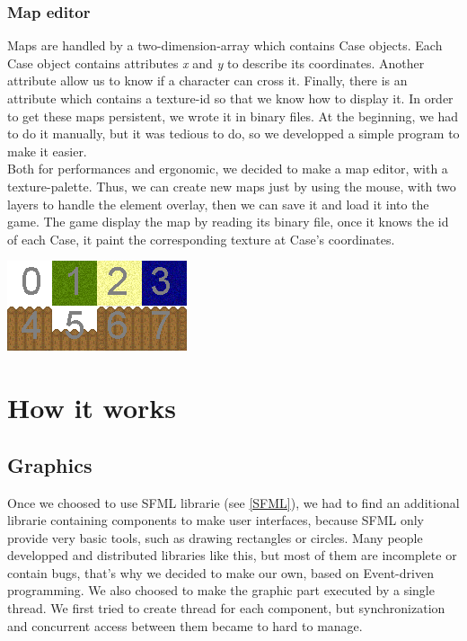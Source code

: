 \documentclass{scrreprt}
\begin{document}
					  \subsection{Map editor}
					  Maps are handled by a two-dimension-array which contains Case objects. Each Case object contains attributes \emph{x} and \emph{y} to describe its coordinates. Another attribute allow us to know if a character can cross it. Finally, there is an attribute which contains a texture-id so that we know how to display it. In order to get these maps persistent, we wrote it in binary files. At the beginning, we had to do it manually, but it was tedious to do, so we developped a simple program to make it easier.\\

					  Both for performances and ergonomic, we decided to make a map editor, with a texture-palette. Thus, we can create new maps just by using the mouse, with two layers to handle the element overlay, then we can save it and load it into the game. The game display the map by reading its binary file, once it knows the id of each Case, it paint the corresponding texture at Case's coordinates.

					  \begin{center}
					  \includegraphics{image1.png}
					  \end{center}


					  \chapter{How it works}
					  \section{Graphics}
					  Once we choosed to use SFML librarie (see \ref{SFML}), we had to find an additional librarie containing components to make user interfaces, because SFML only provide very basic tools, such as drawing rectangles or circles. Many people developped and distributed libraries like this, but most of them are incomplete or contain bugs, that's why we decided to make our own, based on Event-driven programming. We also choosed to make the graphic part executed by a single thread. We first tried to create thread for each component, but synchronization and concurrent access between them became to hard to manage.
\end{document}

